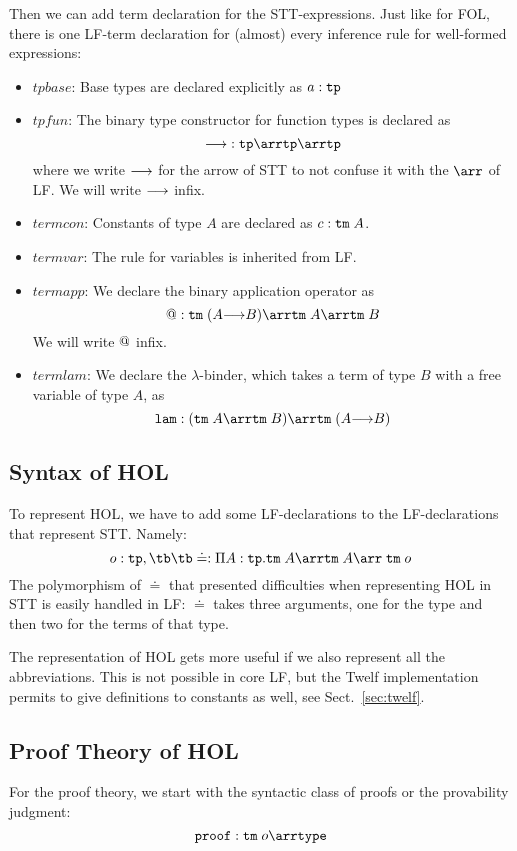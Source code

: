 Then we can add term declaration for the STT-expressions. Just like for FOL, there is one LF-term declaration for (almost) every inference rule for well-formed expressions:

\begin{itemize}
	\item $tpbase$: Base types are declared explicitly as $a:\mathtt{tp}$
	\item $tpfun$: The binary type constructor for function types is declared as
	  \[\Fun:\Type\arr\Type\arr\Type\]
	  where we write $\mathtt{\longrightarrow}$ for the arrow of STT to not confuse it with the $\arr$ of LF. We will write $\mathtt{\longrightarrow}$ infix.
	\item $termcon$: Constants of type $A$ are declared as $c:\mathtt{tm}\;A$.
	\item $termvar$: The rule for variables is inherited from LF.
	\item $termapp$: We declare the binary application operator as
	  \[\App{}{}:\Term\;(A\Fun B) \arr \Term\;A\arr\Term\;B\]
	  We will write $@$ infix.
	\item $termlam$: We declare the $\lambda$-binder, which takes a term of type $B$ with a free variable of type $A$, as
	  \[\Lam:(\Term\;A \arr \Term\;B)\arr\Term\;(A\Fun B)\]
\end{itemize}

\subsection{Syntax of HOL}

To represent HOL, we have to add some LF-declarations to the LF-declarations that represent STT. Namely:
\[o:\Type,\tb\tb \doteq:\P{A}{\Type}\Term\;A\arr\Term\;A\arr\;\Term\; o\]
The polymorphism of $\doteq$ that presented difficulties when representing HOL in STT is easily handled in LF: $\doteq$ takes three arguments, one for the type and then two for the terms of that type.

The representation of HOL gets more useful if we also represent all the abbreviations. This is not possible in core LF, but the Twelf implementation permits to give definitions to constants as well, see Sect.~\ref{sec:twelf}.

\subsection{Proof Theory of HOL}

For the proof theory, we start with the syntactic class of proofs or the provability judgment:
\[\PROOF:\Term\;o\arr\TYPE\]

